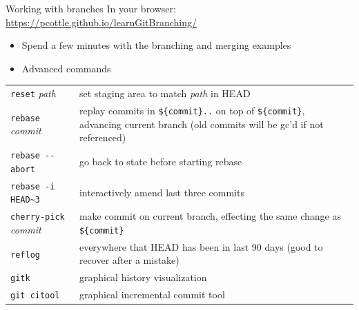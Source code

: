 \documentclass{beamer}
\begin{document}
\begin{frame}{Working with branches}
  In your browser: \url{https://pcottle.github.io/learnGitBranching/}
  \begin{itemize}
  \item Spend a few minutes with the branching and merging examples
  \item Advanced commands
  \end{itemize}
  \begin{tabular}{l p{2.8in}}
    \toprule
    \texttt{reset} \textit{path} & set staging area to match \textit{path} in HEAD \\
    \texttt{rebase} \textit{commit} & replay commits in \texttt{\$\{commit\}..} on top of \texttt{\$\{commit\}}, advancing current branch (old commits will be gc'd if not referenced) \\
    \texttt{rebase -{}-abort} & go back to state before starting rebase \\
    \texttt{rebase -i HEAD\~{}3} & interactively amend last three commits \\
    \texttt{cherry-pick} \textit{commit} & make commit on current branch, effecting the same change as \texttt{\$\{commit\}} \\
    \midrule
    \texttt{reflog} & everywhere that HEAD has been in last 90 days (good to recover after a mistake) \\
    \texttt{gitk} & graphical history visualization \\
    \texttt{git citool} & graphical incremental commit tool \\
    \bottomrule
  \end{tabular}  
\end{frame}

\end{document}
